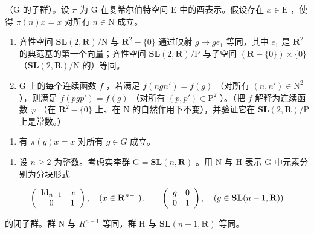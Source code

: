 （G 的子群）。设 \(\pi\) 为 G 在复希尔伯特空间 E 中的酉表示。假设存在 \(x \in \mathrm{E}\) ，使得 \(\pi(n)x = x\) 对所有 \(n \in \mathrm{N}\) 成立。

\begin{enumerate}
\def\labelenumi{\alph{enumi})}
\tightlist
\item
  齐性空间 \(\mathbf{SL}(2, \mathbf{R}) / \mathrm{N}\) 与 \(\mathbf{R}^2 - \{0\}\) 通过映射 \(g \mapsto ge_1\) 等同，其中 \(e_1\) 是 \(\mathbf{R}^2\) 的典范基的第一个向量；齐性空间 \(\mathbf{SL}(2, \mathbf{R}) / \mathrm{P}\) 与子空间 \((\mathbf{R} - \{0\}) \times \{0\}\) （\(\mathbf{SL}(2, \mathbf{R}) / \mathrm{N}\) 的）等同。
\item
  G 上的每个连续函数 \(f\) ，若满足 \(f(ngn') = f(g)\) （对所有 \((n, n') \in \mathrm{N}^2\) ），则满足 \(f(pgp') = f(g)\) （对所有 \((p, p') \in \mathrm{P}^2\) ）。（把 \(f\) 解释为连续函数 \(\varphi\) （在 \(\mathbf{R}^2 - \{0\}\) 上、在 N 的自然作用下不变），并验证它在 \(\mathbf{SL}(2, \mathbf{R}) / \mathrm{P}\) 上是常数。）
\end{enumerate}

\begin{enumerate}
\def\labelenumi{\alph{enumi})}
\setcounter{enumi}{2}
\tightlist
\item
  有 \(\pi(g)x = x\) 对所有 \(g \in G\) 成立。
\end{enumerate}

\begin{enumerate}
\def\labelenumi{\arabic{enumi})}
\setcounter{enumi}{18}
\tightlist
\item
  设 \(n \geqslant 2\) 为整数。考虑实李群 \(\mathrm{G} = \mathbf{SL}(n, \mathbf{R})\) 。用 N 与 H 表示 G 中元素分别为分块形式
\end{enumerate}

\[
\left( \begin{array}{c c} \operatorname{Id} _ {n - 1} & x \\ 0 & 1 \end{array} \right), \quad (x \in \mathbf {R} ^ {n - 1}), \qquad \left( \begin{array}{c c} g & 0 \\ 0 & 1 \end{array} \right), \quad (g \in \mathbf {S L} (n - 1, \mathbf {R}))
\]

的闭子群。群 N 与 \(R^{n-1}\) 等同，群 H 与 \(\mathbf{SL}(n-1,\mathbf{R})\) 等同。

